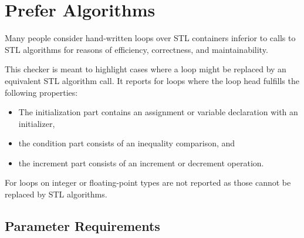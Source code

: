 %
%

\section{Prefer Algorithms}
\label{PreferAlgorithms::overview}

Many people consider hand-written loops over STL containers inferior to calls
to STL algorithms for reasons of efficiency, correctness, and maintainability.

This checker is meant to highlight cases where a loop might be replaced by an
equivalent STL algorithm call. It reports for loops where the loop head
fulfills the following properties:
\begin{itemize}
\item The initialization part contains an assignment or variable declaration
with an initializer,
\item the condition part consists of an inequality comparison, and
\item the increment part consists of an increment or decrement operation.
\end{itemize}
For loops on integer or floating-point types are not reported as those cannot
be replaced by STL algorithms.


\subsection{Parameter Requirements}

